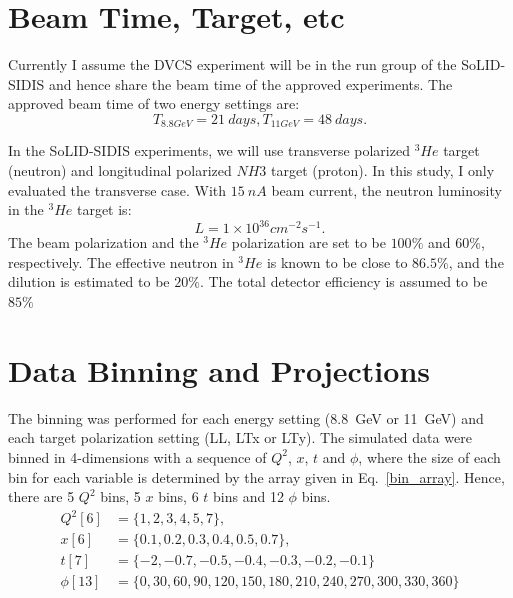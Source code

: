 \documentclass[a4paper,10.5pt]{article}
\begin{document}
\section{Beam Time, Target, etc}
  Currently I assume the DVCS experiment will be in the run group of the SoLID-SIDIS and hence share the beam time of the approved experiments. The approved beam time of two energy settings are:
  \begin{equation}
     T_{8.8GeV} = 21~days, T_{11GeV} = 48~days.
     \label{beamtime}
  \end{equation}
  
  In the SoLID-SIDIS experiments, we will use transverse polarized $^{3}He$ target (neutron) and longitudinal polarized $NH3$ target (proton). In this study, I only evaluated the transverse case. With $15~nA$ beam current, the neutron luminosity in the $^{3}He$ target is:
  \begin{equation}
     L = 1\times 10^{36} cm^{-2}s^{-1}.
     \label{lumi}
  \end{equation}
  The beam polarization and the $^{3}He$ polarization are set to be $100\%$ and $60\%$, respectively. The effective neutron in $^{3}He$ is known to be close to $86.5\%$, and the dilution is estimated to be $20\%$. The total detector efficiency is assumed to be $85\%$
  
\section{Data Binning and Projections}
 The binning was performed for each energy setting (8.8~GeV or 11~GeV) and each target polarization setting (LL, LTx or LTy). The simulated data were binned in 4-dimensions with a sequence of $Q^{2}$, $x$, $t$ and $\phi$, where the size of each bin for each variable is determined by the array given in Eq.~\ref{bin_array}. Hence, there are 5 $Q^{2}$ bins, 5 $x$ bins, 6 $t$ bins and 12 $\phi$ bins.
\begin{equation}
\begin{align*}
 Q^{2}[6] &= \{1,2,3,4,5,7\}, \\
 x[6] &= \{0.1,0.2,0.3,0.4,0.5,0.7\}, \\
 t[7] &=\{-2,-0.7,-0.5,-0.4,-0.3,-0.2,-0.1\}\\
 \phi[13] &=\{0,30,60,90,120,150,180,210,240,270,300,330,360\}
\end{align*}
\label{bin_array}
\end{equation}
\end{document}
